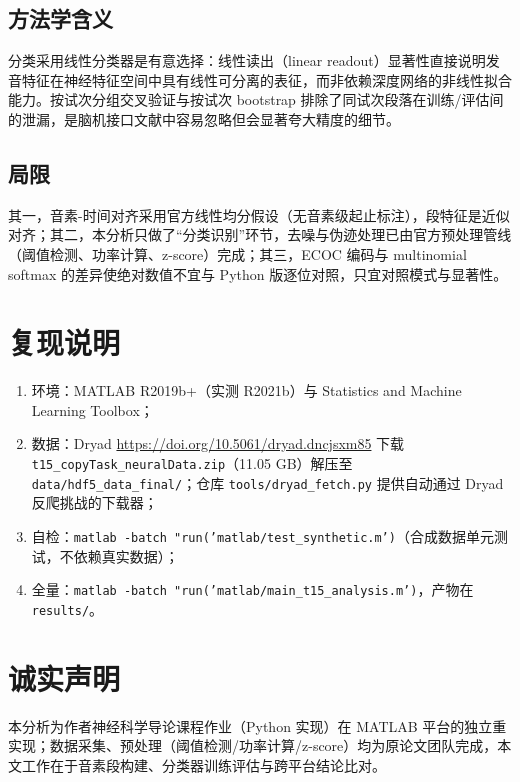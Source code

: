\documentclass[11pt,a4paper]{ctexart}
\begin{document}
\subsection{方法学含义}

分类采用线性分类器是有意选择：线性读出（linear readout）显著性直接说明发音特征在神经特征空间中具有线性可分离的表征，而非依赖深度网络的非线性拟合能力。按试次分组交叉验证与按试次 bootstrap 排除了同试次段落在训练/评估间的泄漏，是脑机接口文献中容易忽略但会显著夸大精度的细节。

\subsection{局限}

其一，音素-时间对齐采用官方线性均分假设（无音素级起止标注），段特征是近似对齐；其二，本分析只做了``分类识别''环节，去噪与伪迹处理已由官方预处理管线（阈值检测、功率计算、z-score）完成；其三，ECOC 编码与 multinomial softmax 的差异使绝对数值不宜与 Python 版逐位对照，只宜对照模式与显著性。

\section{复现说明}

\begin{enumerate}
\item 环境：MATLAB R2019b+（实测 R2021b）与 Statistics and Machine Learning Toolbox；
\item 数据：Dryad \url{https://doi.org/10.5061/dryad.dncjsxm85} 下载 \texttt{t15\_copyTask\_neuralData.zip}（11.05 GB）解压至 \texttt{data/hdf5\_data\_final/}；仓库 \texttt{tools/dryad\_fetch.py} 提供自动通过 Dryad 反爬挑战的下载器；
\item 自检：\texttt{matlab -batch "run('matlab/test\_synthetic.m')}（合成数据单元测试，不依赖真实数据）；
\item 全量：\texttt{matlab -batch "run('matlab/main\_t15\_analysis.m')}，产物在 \texttt{results/}。
\end{enumerate}

\section*{诚实声明}

本分析为作者神经科学导论课程作业（Python 实现）在 MATLAB 平台的独立重实现；数据采集、预处理（阈值检测/功率计算/z-score）均为原论文团队完成，本文工作在于音素段构建、分类器训练评估与跨平台结论比对。
\end{document}
